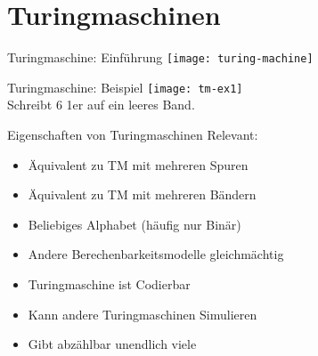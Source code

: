 \section{Turingmaschinen}

\begin{frame}[c]{Turingmaschine: Einführung}
    \texttt{[image: turing-machine]}
\end{frame}


\begin{frame}[c]{Turingmaschine: Beispiel}
    \texttt{[image: tm-ex1]} \\
    Schreibt 6 1er auf ein leeres Band.
\end{frame}


\begin{frame}[c]{Eigenschaften von Turingmaschinen}
    Relevant:
    \begin{itemize}
            \pause
        \item Äquivalent zu TM mit mehreren Spuren
            \pause
        \item Äquivalent zu TM mit mehreren Bändern
            \pause
        \item Beliebiges Alphabet (häufig nur Binär)
            \pause
        \item Andere Berechenbarkeitsmodelle gleichmächtig
            \pause
        \item Turingmaschine ist Codierbar
            \pause
        \item Kann andere Turingmaschinen Simulieren
            \pause
        \item Gibt abzählbar unendlich viele
    \end{itemize}
\end{frame}


